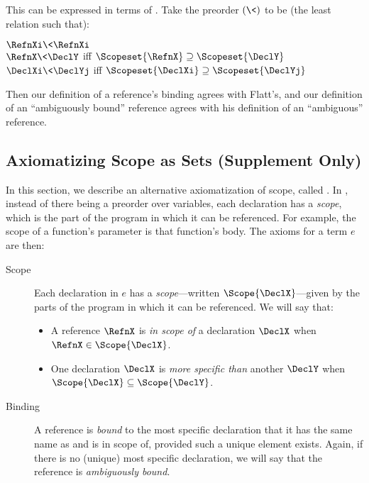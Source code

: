 This can be expressed in terms of {\sap}. Take the preorder
$(\<)$ to be (the least relation such that):
\begin{Table}
$\RefnXi \< \RefnXi$ \\
$\RefnX \< \DeclY$   iff $\Scopeset{\RefnX} \supseteq \Scopeset{\DeclY}$ \\
$\DeclXi \< \DeclYj$ iff $\Scopeset{\DeclXi} \supseteq \Scopeset{\DeclYj}$
\end{Table}
Then our definition of a reference's binding agrees with Flatt's, and
our definition of an ``ambiguously bound'' reference agrees with his
definition of an ``ambiguous'' reference.

\subsection{Axiomatizing Scope as Sets (Supplement Only)}
\label{sec:rscope-sas}

In this section, we describe an alternative axiomatization of scope,
called \emph{\sas}.
In {\sas}, instead of there being a preorder over variables, each
declaration has a \emph{scope}, which is the part of the program in
which it can be referenced. For example, the scope of a function's
parameter is that function's body. The axioms for a term $e$ are then:

\begin{description}
\item[Scope]
  Each declaration in $e$ has a \emph{scope}---written
  $\Scope{\DeclX}$---given by the parts of the program in which it can
  be referenced.
  We will say that:
  \begin{itemize}
  \item A reference $\RefnX$ is \emph{in scope of} a declaration
    $\DeclX$ when $\RefnX \in \Scope{\DeclX}$.
  \item One declaration $\DeclX$ is \emph{more specific than} another
    $\DeclY$ when $\Scope{\DeclX} \subseteq \Scope{\DeclY}$.
  \end{itemize}
\item[Binding]
  A reference is \emph{bound} to the most specific declaration that
  it has the same name as and is in scope of, provided such a unique
  element exists. Again, if there is no (unique) most specific
  declaration, we will say that the reference is \emph{ambiguously
    bound}.
\end{description}

